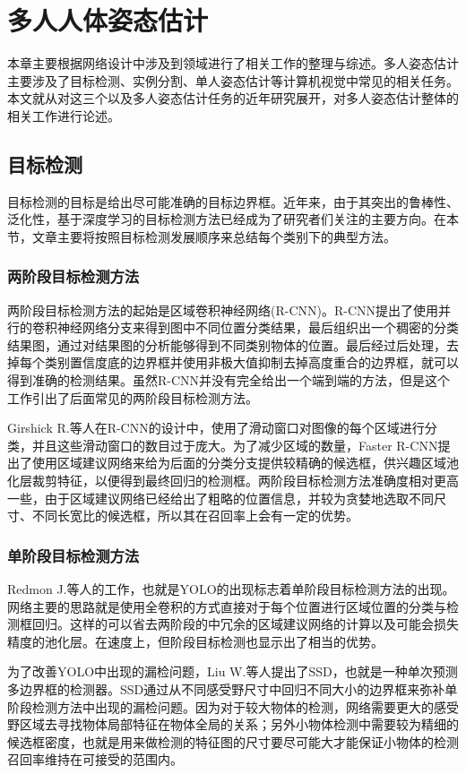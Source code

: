 \chapter{多人人体姿态估计}
\label{cha:related}
本章主要根据网络设计中涉及到领域进行了相关工作的整理与综述。多人姿态估计主要涉及了目标检测、实例分割、单人姿态估计等计算机视觉中常见的相关任务。本文就从对这三个以及多人姿态估计任务的近年研究展开，对多人姿态估计整体的相关工作进行论述。
\section{目标检测}
\label{sec:detect}
目标检测的目标是给出尽可能准确的目标边界框。近年来，由于其突出的鲁棒性、泛化性，基于深度学习的目标检测方法已经成为了研究者们关注的主要方向。在本节，文章主要将按照目标检测发展顺序来总结每个类别下的典型方法。
\subsection{两阶段目标检测方法}
\label{2stagedetector}
两阶段目标检测方法的起始是区域卷积神经网络(R-CNN)\cite{Girshick_2014_CVPR}。R-CNN提出了使用并行的卷积神经网络分支来得到图中不同位置分类结果，最后组织出一个稠密的分类结果图，通过对结果图的分析能够得到不同类别物体的位置。最后经过后处理，去掉每个类别置信度底的边界框并使用非极大值抑制去掉高度重合的边界框，就可以得到准确的检测结果。虽然R-CNN并没有完全给出一个端到端的方法，但是这个工作引出了后面常见的两阶段目标检测方法。

Girshick R.等人在R-CNN的设计中，使用了滑动窗口对图像的每个区域进行分类，并且这些滑动窗口的数目过于庞大。为了减少区域的数量，Faster R-CNN\cite{Ren2015Faster}提出了使用区域建议网络来给为后面的分类分支提供较精确的候选框，供兴趣区域池化层裁剪特征，以便得到最终回归的检测框。两阶段目标检测方法准确度相对更高一些，由于区域建议网络已经给出了粗略的位置信息，并较为贪婪地选取不同尺寸、不同长宽比的候选框，所以其在召回率上会有一定的优势。

\subsection{单阶段目标检测方法}
\label{subsec:1stagedetector}
Redmon J.\cite{redmon2016you}等人的工作，也就是YOLO的出现标志着单阶段目标检测方法的出现。网络主要的思路就是使用全卷积的方式直接对于每个位置进行区域位置的分类与检测框回归。这样的可以省去两阶段的中冗余的区域建议网络的计算以及可能会损失精度的池化层。在速度上，但阶段目标检测也显示出了相当的优势。

为了改善YOLO中出现的漏检问题，Liu W.等人提出了SSD\cite{liu2016ssd}，也就是一种单次预测多边界框的检测器。SSD通过从不同感受野尺寸中回归不同大小的边界框来弥补单阶段检测方法中出现的漏检问题。因为对于较大物体的检测，网络需要更大的感受野区域去寻找物体局部特征在物体全局的关系；另外小物体检测中需要较为精细的候选框密度，也就是用来做检测的特征图的尺寸要尽可能大才能保证小物体的检测召回率维持在可接受的范围内。

